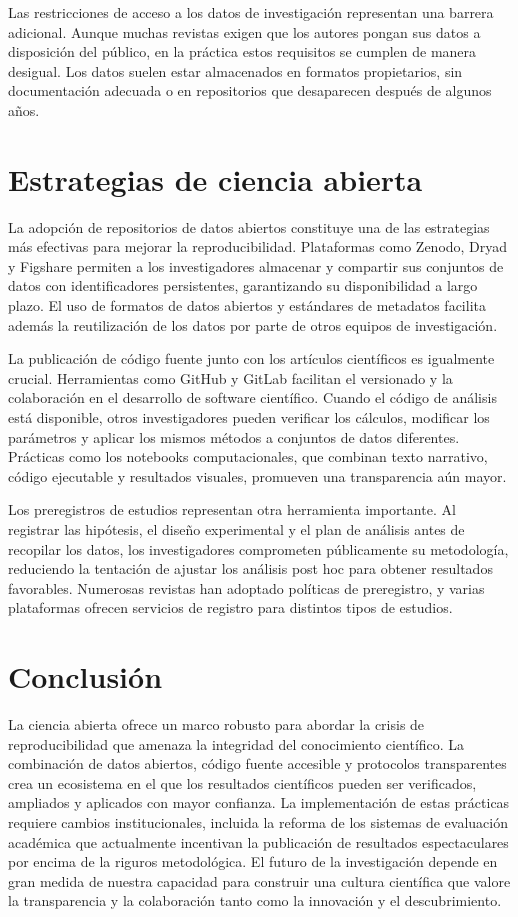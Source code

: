 \documentclass[
    language=spanish,
    doctype=article,
]{../../omnilatex}
\begin{document}
Las restricciones de acceso a los datos de investigación representan una barrera adicional. Aunque muchas revistas exigen que los autores pongan sus datos a disposición del público, en la práctica estos requisitos se cumplen de manera desigual. Los datos suelen estar almacenados en formatos propietarios, sin documentación adecuada o en repositorios que desaparecen después de algunos años.

\section{Estrategias de ciencia abierta}
La adopción de repositorios de datos abiertos constituye una de las estrategias más efectivas para mejorar la reproducibilidad. Plataformas como Zenodo, Dryad y Figshare permiten a los investigadores almacenar y compartir sus conjuntos de datos con identificadores persistentes, garantizando su disponibilidad a largo plazo. El uso de formatos de datos abiertos y estándares de metadatos facilita además la reutilización de los datos por parte de otros equipos de investigación.

La publicación de código fuente junto con los artículos científicos es igualmente crucial. Herramientas como GitHub y GitLab facilitan el versionado y la colaboración en el desarrollo de software científico. Cuando el código de análisis está disponible, otros investigadores pueden verificar los cálculos, modificar los parámetros y aplicar los mismos métodos a conjuntos de datos diferentes. Prácticas como los notebooks computacionales, que combinan texto narrativo, código ejecutable y resultados visuales, promueven una transparencia aún mayor.

Los preregistros de estudios representan otra herramienta importante. Al registrar las hipótesis, el diseño experimental y el plan de análisis antes de recopilar los datos, los investigadores comprometen públicamente su metodología, reduciendo la tentación de ajustar los análisis post hoc para obtener resultados favorables. Numerosas revistas han adoptado políticas de preregistro, y varias plataformas ofrecen servicios de registro para distintos tipos de estudios.

\section{Conclusión}
La ciencia abierta ofrece un marco robusto para abordar la crisis de reproducibilidad que amenaza la integridad del conocimiento científico. La combinación de datos abiertos, código fuente accesible y protocolos transparentes crea un ecosistema en el que los resultados científicos pueden ser verificados, ampliados y aplicados con mayor confianza. La implementación de estas prácticas requiere cambios institucionales, incluida la reforma de los sistemas de evaluación académica que actualmente incentivan la publicación de resultados espectaculares por encima de la riguros metodológica. El futuro de la investigación depende en gran medida de nuestra capacidad para construir una cultura científica que valore la transparencia y la colaboración tanto como la innovación y el descubrimiento.
\end{document}

